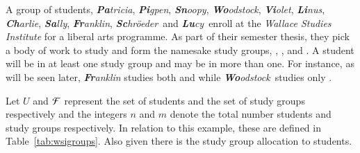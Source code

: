 \documentclass[MS,synopsis]{iitmdiss}
\begin{document}
\def \xLLL {\mathbb{B}}
\def \xGGG {\mathbb{T}} 
\def \xBBB {\mathbb{W}}
\def \xTTT {\mathbb{F}}




\def \Pa {{\em {\bf Pa}tricia}} 
\def \Pi {{\em {\bf Pi}gpen}} %
\def \Sn {{\em {\bf Sn}oopy}}
\def \Wo {{\em {\bf Wo}odstock}}
\def \Vi {{\em {\bf Vi}olet}} 
\def \Li {{\em {\bf Li}nus}} 
\def \Ch {{\em {\bf Ch}arlie}}
\def \Sa {{\em {\bf Sa}lly}}
\def \Fr {{\em {\bf Fr}anklin}}  %
\def \Sc {{\em {\bf Sc}hr{\"o}eder}} 
\def \Lu {{\em {\bf Lu}cy}}

\def \xPa {{\bf Pa}} 
\def \xPi {{\bf Pi}} 
\def \xSn {{\bf Sn}}
\def \xWo {{\bf Wo}}
\def \xVi {{\bf Vi}} 
\def \xLi {{\bf Li}} 
\def \xCh {{\bf Ch}}
\def \xSa {{\bf Sa}}
\def \xFr {{\bf Fr}}
\def \xSc {{\bf Sc}} 
\def \xLu {{\bf Lu}}

\def \residenceblock {{\em Infinite Loop}}

\def \WSI {{\em Wallace Studies Institute}}

\def \coneohone {{\em ``Influence of post modernism in Wallace's work''}}
\def \coneohtwo {{\em ``A study on fragmented prose method''}}


A group of students, \Pa, \Pi, \Sn, \Wo, \Vi, \Li, \Ch, \Sa, \Fr,
  \Sc\ and \Lu\ enroll at the
  {\WSI} for a liberal arts programme.  As part of their semester
  thesis, they pick a body of work to study and form the namesake
  study groups, {\LLL}, {\GGG}, {\BBB} and {\TTT}. A student will be in at least one study
  group and may be in more than one. For instance, as will be seen
  later, {\Fr} studies both {\LLL} and {\TTT} while \Wo\ studies only
  \BBB.

Let $U$ and ${\cal F}$ represent the set of students and the set of study
groups respectively and the integers $n$ and $m$ denote the total
number students and study groups respectively. In relation to this
example, these are defined in Table~\ref{tab:wsigroups}. Also given
there is the study group allocation to students.
\end{document}
